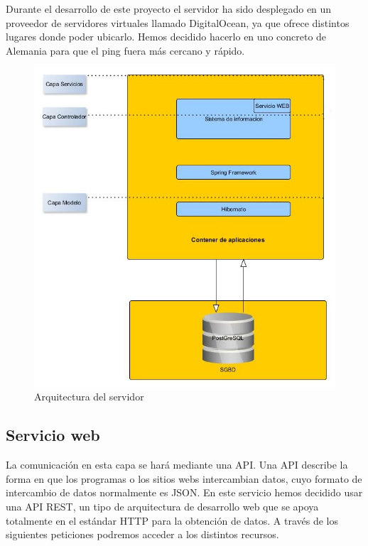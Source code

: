 Durante el desarrollo de este proyecto el servidor ha sido desplegado en un proveedor de servidores virtuales llamado 
  DigitalOcean, ya que ofrece distintos lugares donde poder ubicarlo. Hemos decidido hacerlo en uno concreto de Alemania para que el ping fuera más cercano y rápido.
\begin{figure}
		\centering
		\includegraphics[width=\textwidth] {arquitectura-servidor.jpg}
		\caption{Arquitectura del servidor }
		\label{fig:arquitectura-servidor}
	\end{figure}


\subsection{Servicio web}
 La comunicación en esta capa se hará mediante una API. Una API describe la forma en que los programas o los sitios webs intercambian datos, cuyo formato  de intercambio de datos normalmente es JSON. En este servicio hemos decidido usar una API REST, un tipo de arquitectura de desarrollo web que se apoya totalmente en el estándar HTTP para la obtención de datos. A través de los siguientes peticiones podremos acceder a los distintos recursos.
 


